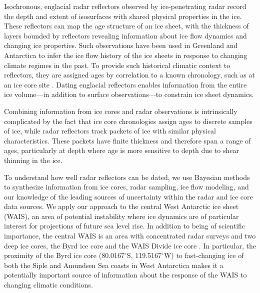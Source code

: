 

Isochronous, englacial radar reflectors observed by ice-penetrating radar record the depth and extent of isosurfaces with shared physical properties in the ice. These reflectors can map the age structure of an ice sheet, with the thickness of layers bounded by reflectors revealing information about ice flow dynamics and changing ice properties. Such observations have been used in Greenland and Antarctica to infer the ice flow history of the ice sheets in response to changing climate regimes in the past. To provide such historical climatic context to reflectors, they are assigned ages by correlation to a known chronology, such as at an ice core site \citep{cavitte2016}. Dating englacial reflectors enables information from the entire ice volume---in addition to surface observations---to constrain ice sheet dynamics. 

Combining information from ice cores and radar observations is intrinsically complicated by the fact that ice core chronologies assign ages to discrete samples of ice, while radar reflectors track packets of ice with similar physical characteristics. These packets have finite thickness and therefore span a range of ages, particularly at depth where age is more sensitive to depth due to shear thinning in the ice. 

To understand how well radar reflectors can be dated, we use Bayesian methods \citep{metropolis1953,hastings1970,gelfand1992} to synthesize information from ice cores, radar sampling, ice flow modeling, and our knowledge of the leading sources of uncertainty within the radar and ice core data sources. We apply our approach to the central West Antarctic ice sheet (WAIS), an area of potential instability where ice dynamics are of particular interest for projections of future sea level rise. In addition to being of scientific importance, the central WAIS is an area with concentrated radar surveys and two deep ice cores, the Byrd ice core \citep{gow1968} and the WAIS Divide ice core \citep{buizert2015}. In particular, the proximity of the Byrd ice core (80.0167$^\circ$S, 119.5167$^\circ$W) to fast-changing ice of both the Siple and Amundsen Sea coasts in West Antarctica makes it a potentially important source of information about the response of the WAIS to changing climatic conditions.

